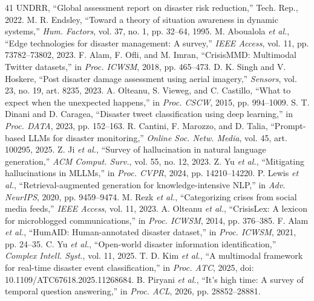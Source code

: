 \documentclass[conference]{IEEEtran}
\begin{document}
\begin{thebibliography}{41}
\setlength{\itemsep}{-3pt}\setlength{\parskip}{0pt}\scriptsize
{} UNDRR, ``Global assessment report on disaster risk reduction,'' Tech. Rep., 2022.
 M. R. Endsley, ``Toward a theory of situation awareness in dynamic systems,'' \textit{Hum. Factors}, vol. 37, no. 1, pp. 32--64, 1995.
 M. Aboualola \textit{et al.}, ``Edge technologies for disaster management: A survey,'' \textit{IEEE Access}, vol. 11, pp. 73782--73802, 2023.
 F. Alam, F. Ofli, and M. Imran, ``CrisisMMD: Multimodal Twitter datasets,'' in \textit{Proc. ICWSM}, 2018, pp. 465--473.
 D. K. Singh and V. Hoskere, ``Post disaster damage assessment using aerial imagery,'' \textit{Sensors}, vol. 23, no. 19, art. 8235, 2023.
 A. Olteanu, S. Vieweg, and C. Castillo, ``What to expect when the unexpected happens,'' in \textit{Proc. CSCW}, 2015, pp. 994--1009.
 S. T. Dinani and D. Caragea, ``Disaster tweet classification using deep learning,'' in \textit{Proc. DATA}, 2023, pp. 152--163.
 R. Cantini, F. Marozzo, and D. Talia, ``Prompt-based LLMs for disaster monitoring,'' \textit{Online Soc. Netw. Media}, vol. 45, art. 100295, 2025.
 Z. Ji \textit{et al.}, ``Survey of hallucination in natural language generation,'' \textit{ACM Comput. Surv.}, vol. 55, no. 12, 2023.
 Z. Yu \textit{et al.}, ``Mitigating hallucinations in MLLMs,'' in \textit{Proc. CVPR}, 2024, pp. 14210--14220.
 P. Lewis \textit{et al.}, ``Retrieval-augmented generation for knowledge-intensive NLP,'' in \textit{Adv. NeurIPS}, 2020, pp. 9459--9474.
 M. Rezk \textit{et al.}, ``Categorizing crises from social media feeds,'' \textit{IEEE Access}, vol. 11, 2023.
 A. Olteanu \textit{et al.}, ``CrisisLex: A lexicon for microblogged communications,'' in \textit{Proc. ICWSM}, 2014, pp. 376--385.
 F. Alam \textit{et al.}, ``HumAID: Human-annotated disaster dataset,'' in \textit{Proc. ICWSM}, 2021, pp. 24--35.
 C. Yu \textit{et al.}, ``Open-world disaster information identification,'' \textit{Complex Intell. Syst.}, vol. 11, 2025.
 T. D. Kim \textit{et al.}, ``A multimodal framework for real-time disaster event classification,'' in \textit{Proc. ATC}, 2025, doi: 10.1109/ATC67618.2025.11268684.
 B. Piryani \textit{et al.}, ``It's high time: A survey of temporal question answering,'' in \textit{Proc. ACL}, 2026, pp. 28852--28881.

\end{thebibliography}
\end{document}

